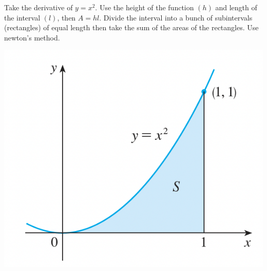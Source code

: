 \documentclass[addpoints, 12pt]{exam}%
\begin{document}
\begin{questions}
\begin{minipage}{0.5\textwidth}
\begin{choices}
\choice Take the derivative of $y = x^2$. \vspace*{10pt}
\choice Use the height of the function $(h)$ and length of the interval $(l)$, then $A = hl$. \vspace*{10pt}
\CorrectChoice Divide the interval into a bunch of subintervals (rectangles) of equal length then take the sum of the areas of the rectangles. \vspace*{10pt}
\choice Use newton's method. \vspace*{10pt}
\end{choices}
\end{minipage}
\hspace*{1cm}
\begin{minipage}{0.35\textwidth}
\includegraphics[width=1\textwidth]{Homework11-graph.png}
\end{minipage}



\end{questions}
\end{document}

